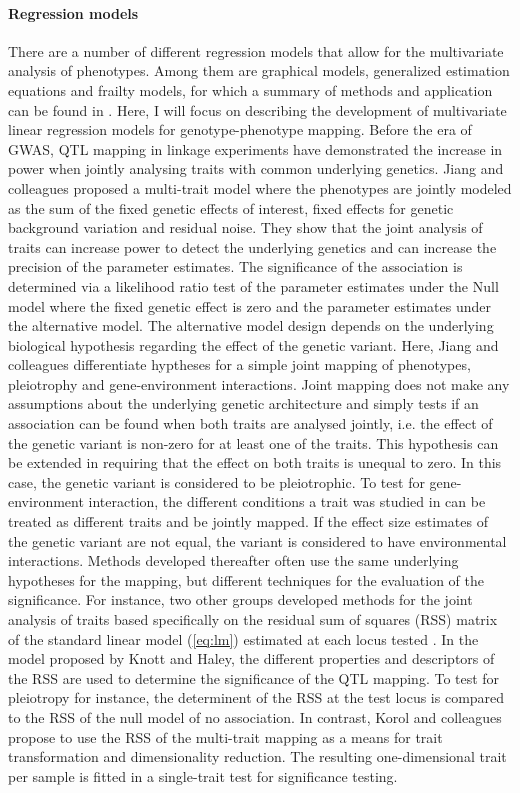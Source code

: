 \paragraph{Regression models} There are a number of different regression models that allow for the multivariate analysis of phenotypes. Among them are graphical models, generalized estimation equations and frailty models, for which a summary of methods and application can be found in \citep{Shriner2012,Yang2012}. Here, I will focus on describing the development of multivariate linear regression models for genotype-phenotype mapping. Before the era of GWAS, QTL mapping in linkage experiments have demonstrated the increase in power when jointly analysing traits with common underlying genetics. Jiang and colleagues \citeyearpar{Jiang1995} proposed a multi-trait model where the phenotypes are jointly modeled as the sum of the fixed genetic effects of interest, fixed effects for genetic background variation and residual noise. They show that the joint analysis of traits can increase power to detect the underlying genetics and can increase the precision of the parameter estimates. The significance of the association is determined via a likelihood ratio test of the parameter estimates under the Null model where the fixed genetic effect is zero and the parameter estimates under the alternative model. The alternative model design depends on the underlying biological hypothesis regarding the effect of the genetic variant. Here, Jiang and colleagues differentiate hyptheses for a simple joint mapping of phenotypes, pleiotrophy and gene-environment interactions. Joint mapping does not make any assumptions about the underlying genetic architecture and simply tests if an association can be found when both traits are analysed jointly, i.e. the effect of the genetic variant is non-zero for at least one of the traits. This hypothesis can be extended in requiring that the effect on both traits is unequal to zero. In this case, the genetic variant is considered to be pleiotrophic. To test for gene-environment interaction, the different conditions a trait was studied in can be treated as different traits and be jointly mapped. If the effect size estimates of the genetic variant are not equal, the variant is considered to have environmental interactions.  Methods developed thereafter often use the same underlying hypotheses for the mapping, but different techniques for the evaluation of the significance. For instance, two other groups developed methods for the joint analysis of traits based specifically on the residual sum of squares (RSS) matrix of the standard linear model (\cref{eq:lm}) estimated at each locus tested \citep{Knott2000,Korol2001}. In the model proposed by Knott and Haley, the different properties and descriptors of the RSS are used to determine the significance of the QTL mapping. To test for pleiotropy for instance, the determinent of the RSS at the test locus is compared to the RSS of the null model of no association. In contrast, Korol and colleagues propose to use the RSS of the multi-trait mapping as a means for trait transformation and dimensionality reduction. The resulting one-dimensional trait per sample is fitted in a single-trait test for significance testing.  